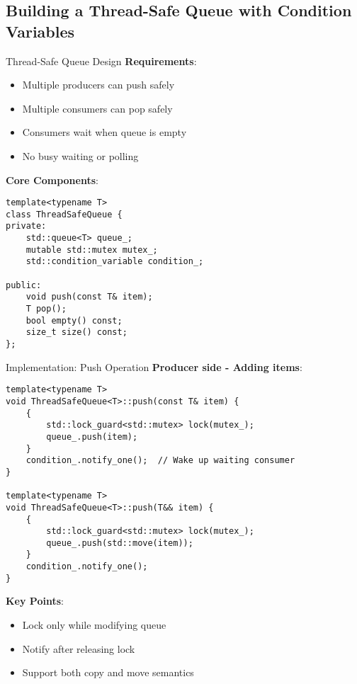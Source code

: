 \subsection{Building a Thread-Safe Queue with Condition Variables}
\begin{frame}[fragile]{Thread-Safe Queue Design}
	\textbf{Requirements}:
	\begin{itemize}
		\item Multiple producers can push safely
		\item Multiple consumers can pop safely
		\item Consumers wait when queue is empty
		\item No busy waiting or polling
	\end{itemize}

	\vspace{1em}
	\textbf{Core Components}:
	\begin{verbatim}
template<typename T>
class ThreadSafeQueue {
private:
    std::queue<T> queue_;
    mutable std::mutex mutex_;
    std::condition_variable condition_;

public:
    void push(const T& item);
    T pop();
    bool empty() const;
    size_t size() const;
};
	\end{verbatim}
\end{frame}

\begin{frame}[fragile]{Implementation: Push Operation}
	\textbf{Producer side - Adding items}:

	\begin{verbatim}
template<typename T>
void ThreadSafeQueue<T>::push(const T& item) {
    {
        std::lock_guard<std::mutex> lock(mutex_);
        queue_.push(item);
    }
    condition_.notify_one();  // Wake up waiting consumer
}

template<typename T>
void ThreadSafeQueue<T>::push(T&& item) {
    {
        std::lock_guard<std::mutex> lock(mutex_);
        queue_.push(std::move(item));
    }
    condition_.notify_one();
}
	\end{verbatim}

	\textbf{Key Points}:
	\begin{itemize}
		\item Lock only while modifying queue
		\item Notify after releasing lock
		\item Support both copy and move semantics
	\end{itemize}
\end{frame}

